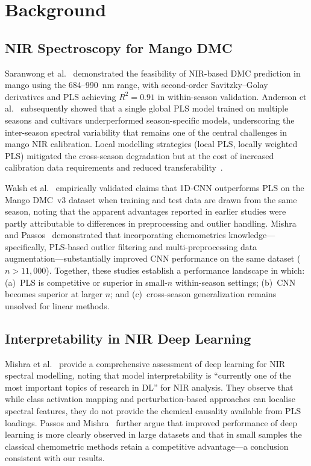 \documentclass[preprint,12pt,hidelinks]{elsarticle}
\begin{document}
\section{Background}

\subsection{NIR Spectroscopy for Mango DMC}

Saranwong et al.~\cite{saranwong2004} demonstrated the feasibility of
NIR-based DMC prediction in mango using the 684--990~nm range,
with second-order Savitzky--Golay derivatives and PLS achieving
$R^2 = 0.91$ in within-season validation. Anderson et al.~\cite{anderson2020}
subsequently showed that a single global PLS model trained on multiple
seasons and cultivars underperformed season-specific models, underscoring
the inter-season spectral variability that remains one of the central
challenges in mango NIR calibration. Local modelling strategies
(local PLS, locally weighted PLS) mitigated the cross-season degradation
but at the cost of increased calibration data requirements and reduced
transferability~\cite{anderson2020b}.

Walsh et al.~\cite{walsh2024,ke2022} empirically validated claims that 1D-CNN
outperforms PLS on the Mango DMC~v3 dataset when training and test data are
drawn from the same season, noting that the apparent advantages reported in
earlier studies were partly attributable to differences in preprocessing and
outlier handling. Mishra and Passos~\cite{mishra2021synergistic,mishra2023semi} demonstrated
that incorporating chemometrics knowledge---specifically, PLS-based outlier
filtering and multi-preprocessing data augmentation---substantially improved
CNN performance on the same dataset ($n > 11{,}000$). Together, these studies
establish a performance landscape in which: (a)~PLS is competitive or
superior in small-$n$ within-season settings; (b)~CNN becomes superior at
larger $n$; and (c)~cross-season generalization remains unsolved for linear
methods.

\subsection{Interpretability in NIR Deep Learning}

Mishra et al.~\cite{mishra2022hypes} provide a comprehensive assessment of
deep learning for NIR spectral modelling, noting that model interpretability
is ``currently one of the most important topics of research in DL'' for
NIR analysis. They observe that while class activation mapping and
perturbation-based approaches can localise spectral features, they do not
provide the chemical causality available from PLS loadings. Passos and
Mishra~\cite{passos2022perspectives} further argue that improved performance
of deep learning is more clearly observed in large datasets and that in
small samples the classical chemometric methods retain a competitive
advantage---a conclusion consistent with our results.
\end{document}
